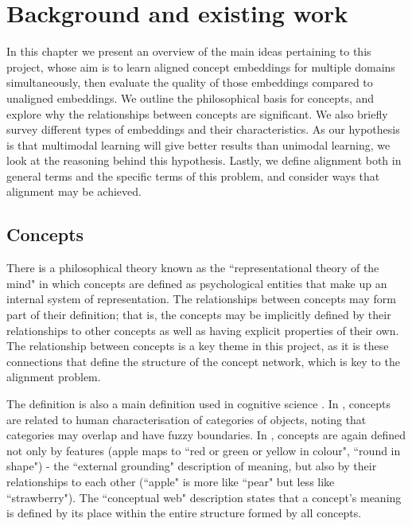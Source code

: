\chapter{Background and existing work}

In this chapter we present an overview of the main ideas pertaining to this project, whose aim is to learn aligned concept embeddings for multiple domains simultaneously, then evaluate the quality of those embeddings compared to unaligned embeddings. We outline the philosophical basis for concepts, and explore why the relationships between concepts are significant. We also briefly survey different types of embeddings and their characteristics. As our hypothesis is that multimodal learning will give better results than unimodal learning, we look at the reasoning behind this hypothesis. Lastly, we define alignment both in general terms and the specific terms of this problem, and consider ways that alignment may be achieved. 

\section{Concepts}

There is a philosophical theory known as the ``representational theory of the mind" \cite{stanfordconcepts} in which concepts are defined as psychological entities that make up an internal system of representation. The relationships between concepts may form part of their definition; that is, the concepts may be implicitly defined by their relationships to other concepts as well as having explicit properties of their own. The relationship between concepts is a key theme in this project, as it is these connections that define the structure of the concept network, which is key to the alignment problem. 

The \cite{stanfordconcepts} definition is also a main definition used in cognitive science \cite{Pinker2007}. In \cite{NatureOfHumanConcepts}, concepts are related to human characterisation of categories of objects, noting that categories may overlap and have fuzzy boundaries. In \cite{GOLDSTONE2002295}, concepts are again defined not only by features (apple maps to ``red or green or yellow in colour", ``round in shape") - the ``external grounding" description of meaning, but also by their relationships to each other (``apple" is more like ``pear" but less like ``strawberry"). The ``conceptual web" description states that a concept's meaning is defined by its place within the entire structure formed by all concepts. 

